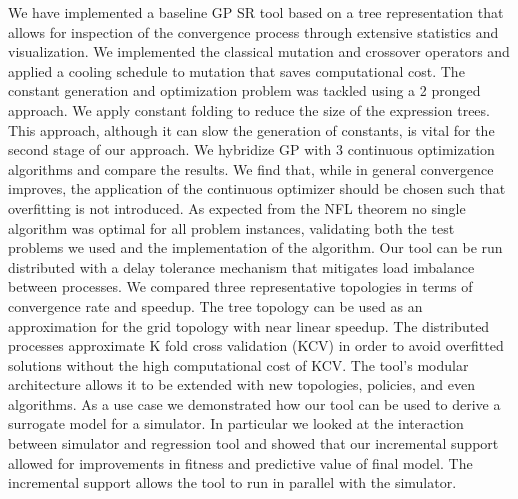 
We have implemented a baseline GP SR tool based on a tree representation that allows for inspection of the convergence process through extensive statistics and visualization. We implemented the classical mutation and crossover operators and applied a cooling schedule to mutation that saves computational cost. 
The constant generation and optimization problem was tackled using a 2 pronged approach. We apply constant folding to reduce the size of the expression trees. This approach, although it can slow the generation of constants, is vital for the second stage of our approach. We hybridize GP with 3 continuous optimization algorithms and compare the results. We find that, while in general convergence improves, the application of the continuous optimizer should be chosen such that overfitting is not introduced.
As expected from the NFL theorem no single algorithm was optimal for all problem instances, validating both the test problems we used and the implementation of the algorithm.
Our tool can be run distributed with a delay tolerance mechanism that mitigates load imbalance between processes. We compared three representative topologies in terms of convergence rate and speedup. The tree topology can be used as an approximation for the grid topology with near linear speedup. 
The distributed processes approximate K fold cross validation (KCV) in order to avoid overfitted solutions without the high computational cost of KCV. 
The tool's modular architecture allows it to be extended with new topologies, policies, and even algorithms. 
As a use case we demonstrated how our tool can be used to derive a surrogate model for a simulator. In particular we looked at the interaction between simulator and regression tool and showed that our incremental support allowed for improvements in fitness and predictive value of final model. The incremental support allows the tool to run in parallel with the simulator.
